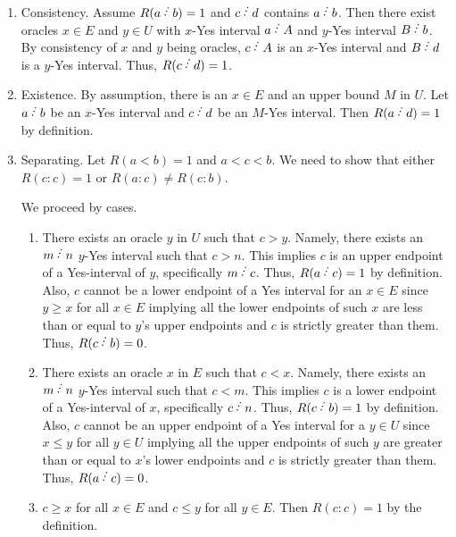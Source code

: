 \documentclass[12pt]{article}
\begin{document}
\begin{enumerate}
    \item Consistency. Assume $R(a \lte b)=1$ and $c\lte d$ contains $a\lte b$. Then there exist oracles $x \in E$ and $y \in U$ with $x$-Yes interval $a\lte A$ and $y$-Yes interval $B\lte b$. By consistency of $x$ and $y$ being oracles, $c\lte A$ is an $x$-Yes interval and $B\lte d$ is a $y$-Yes interval. Thus, $R(c\lte d) = 1$.
    \item Existence. By assumption, there is an $x \in E$ and an upper bound $M$ in $U$. Let $a\lte b$ be an $x$-Yes interval and $c\lte d$ be an $M$-Yes interval. Then $R(a\lte d) = 1$ by definition.  
    \item Separating. Let $R(a\lt b)=1$ and $a < c< b$. We need to show that either $R(c:c)=1$ or $R(a:c) \neq R(c:b)$. 

    We proceed by cases.
    \begin{enumerate}
    \item There exists an oracle $y$ in $U$ such that $c > y$. Namely, there exists an $m \lte n$ $y$-Yes interval such that $c > n$.  This implies $c$ is an upper endpoint of a Yes-interval of $y$, specifically $m \lte c$. Thus, $R(a \lte c) = 1$ by definition. Also, $c$ cannot be a lower endpoint of a Yes interval for an  $x \in E$ since $y \geq x$ for all $x \in E$ implying all the lower endpoints of such $x$ are less than or equal to $y$'s upper endpoints and $c$ is strictly greater than them. Thus, $R(c \lte b) = 0$. 

    \item There exists an oracle $x$ in $E$ such that $c < x$. Namely, there exists an $m \lte n$ $y$-Yes interval such that $c < m$. This implies $c$ is a lower endpoint of a Yes-interval of $x$, specifically $c \lte n$. Thus, $R(c \lte b) = 1$ by definition. Also, $c$ cannot be an upper endpoint of a Yes interval for a $y \in U$ since $x \leq y$ for all $y \in U$ implying all the upper endpoints of such $y$ are greater than or equal to $x$'s lower endpoints and $c$ is strictly greater than them. Thus, $R(a \lte c) = 0$.

    \item $c \geq x$ for all $x \in E$ and $c \leq y$ for all $y \in E$. Then $R(c:c) = 1$ by the definition. 

     \end{enumerate}
    

\end{enumerate}
\end{document}
